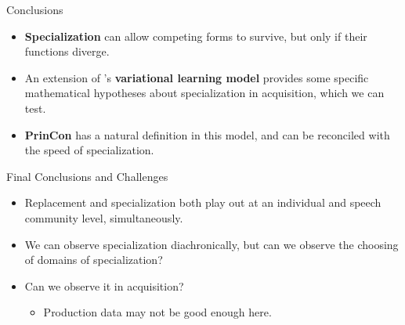 \documentclass[hyperref={pdfpagelabels=false}]{beamer}
\begin{document}
\begin{frame}{Conclusions}
		\begin{itemize}
			\item \textbf{Specialization} can allow competing forms to survive, but only if their functions diverge.
			\item An extension of \citet{yang2000,yang2002}'s \textbf{variational learning model} provides some specific mathematical hypotheses about specialization in acquisition, which we can test.
			\item \textbf{PrinCon} has a natural definition in this model, and can be reconciled with the speed of specialization.
		\end{itemize}
\end{frame}



\begin{frame}{Final Conclusions and Challenges}
		\begin{itemize}
			\item Replacement and specialization both play out at an individual and speech community level, simultaneously.
			\item We can observe specialization diachronically, but can we observe the choosing of domains of specialization?
			\item Can we observe it in acquisition?
				\begin{itemize}
					\item Production data may not be good enough here.
				\end{itemize}
		\end{itemize}
\end{frame}
\end{document}
